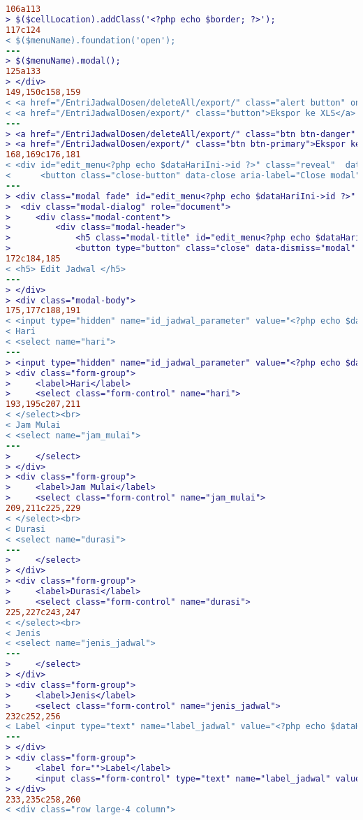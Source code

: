 \begin{lstlisting}[language=diff, caption=Kode untuk Halaman Entri Jadwal Dosen,  basicstyle=\ttfamily, frame=single,
columns=fullflexible, keepspaces=true, breaklines=true, label={lst:mainEntriJadwalDosen}]
106a113
> $($cellLocation).addClass('<?php echo $border; ?>');
117c124
< $($menuName).foundation('open');
---
> $($menuName).modal();
125a133
> </div>
149,150c158,159
< <a href="/EntriJadwalDosen/deleteAll/export/" class="alert button" onClick="return konfirmasi();">Delete All</a>
< <a href="/EntriJadwalDosen/export/" class="button">Ekspor ke XLS</a>
---
> <a href="/EntriJadwalDosen/deleteAll/export/" class="btn btn-danger" onClick="return konfirmasi();">Delete All</a>
> <a href="/EntriJadwalDosen/export/" class="btn btn-primary">Ekspor ke XLS</a>
168,169c176,181
< <div id="edit_menu<?php echo $dataHariIni->id ?>" class="reveal"  data-reveal >
<      <button class="close-button" data-close aria-label="Close modal" type="button">
---
> <div class="modal fade" id="edit_menu<?php echo $dataHariIni->id ?>" tabindex="-1" role="dialog" aria-labelledby="edit_menu<?php echo $dataHariIni->id ?>" aria-hidden="true">
>  <div class="modal-dialog" role="document">
>     <div class="modal-content">
>         <div class="modal-header">
>             <h5 class="modal-title" id="edit_menu<?php echo $dataHariIni->id ?>">Edit Jadwal</h5>
>             <button type="button" class="close" data-dismiss="modal" aria-label="Close">
172c184,185
< <h5> Edit Jadwal </h5>
---
> </div>
> <div class="modal-body">
175,177c188,191
< <input type="hidden" name="id_jadwal_parameter" value="<?php echo $dataHariIni->id ?>"> </a> <br>
< Hari 
< <select name="hari"> 
---
> <input type="hidden" name="id_jadwal_parameter" value="<?php echo $dataHariIni->id ?>">
> <div class="form-group">
>     <label>Hari</label>
>     <select class="form-control" name="hari">
193,195c207,211
< </select><br>
< Jam Mulai
< <select name="jam_mulai"> 
---
>     </select>
> </div>
> <div class="form-group">
>     <label>Jam Mulai</label>
>     <select class="form-control" name="jam_mulai">
209,211c225,229
< </select><br>
< Durasi
< <select name="durasi"> 
---
>     </select>
> </div>
> <div class="form-group">
>     <label>Durasi</label>
>     <select class="form-control" name="durasi">
225,227c243,247
< </select><br>
< Jenis  
< <select name="jenis_jadwal"> 
---
>     </select>
> </div>
> <div class="form-group">
>     <label>Jenis</label>
>     <select class="form-control" name="jenis_jadwal">
232c252,256
< Label <input type="text" name="label_jadwal" value="<?php echo $dataHariIni->label; ?>"><br> 
---
> </div>
> <div class="form-group">
>     <label for="">Label</label>
>     <input class="form-control" type="text" name="label_jadwal" value="<?php echo $dataHariIni->label; ?>">
> </div>
233,235c258,260
< <div class="row large-4 column">

\end{lstlisting}
